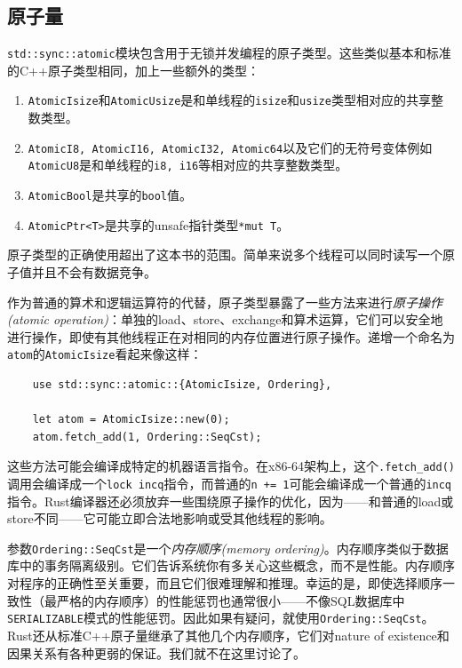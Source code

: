 \subsection{原子量}\label{atomic}
\texttt{std::sync::atomic}模块包含用于无锁并发编程的原子类型。这些类似基本和标准的C++原子类型相同，加上一些额外的类型：
\begin{enumerate}
    \item \texttt{AtomicIsize}和\texttt{AtomicUsize}是和单线程的\texttt{isize}和\texttt{usize}类型相对应的共享整数类型。
    \item \texttt{AtomicI8, AtomicI16, AtomicI32, Atomic64}以及它们的无符号变体例如\texttt{AtomicU8}是和单线程的\texttt{i8, i16}等相对应的共享整数类型。
    \item \texttt{AtomicBool}是共享的\texttt{bool}值。
    \item \texttt{AtomicPtr<T>}是共享的unsafe指针类型\texttt{*mut T}。
\end{enumerate}

原子类型的正确使用超出了这本书的范围。简单来说多个线程可以同时读写一个原子值并且不会有数据竞争。

作为普通的算术和逻辑运算符的代替，原子类型暴露了一些方法来进行\emph{原子操作(atomic operation)}：单独的load、store、exchange和算术运算，它们可以安全地进行操作，即使有其他线程正在对相同的内存位置进行原子操作。递增一个命名为\texttt{atom}的\texttt{AtomicIsize}看起来像这样：
\begin{verbatim}
    use std::sync::atomic::{AtomicIsize, Ordering},

    let atom = AtomicIsize::new(0);
    atom.fetch_add(1, Ordering::SeqCst);
\end{verbatim}

这些方法可能会编译成特定的机器语言指令。在x86-64架构上，这个\texttt{.fetch\_add()}调用会编译成一个\texttt{lock incq}指令，而普通的\texttt{n += 1}可能会编译成一个普通的\texttt{incq}指令。Rust编译器还必须放弃一些围绕原子操作的优化，因为——和普通的load或store不同——它可能立即合法地影响或受其他线程的影响。 

参数\texttt{Ordering::SeqCst}是一个\emph{内存顺序(memory ordering)}。内存顺序类似于数据库中的事务隔离级别。它们告诉系统你有多关心这些概念，而不是性能。内存顺序对程序的正确性至关重要，而且它们很难理解和推理。幸运的是，即使选择顺序一致性（最严格的内存顺序）的性能惩罚也通常很小——不像SQL数据库中\texttt{SERIALIZABLE}模式的性能惩罚。因此如果有疑问，就使用\texttt{Ordering::SeqCst}。Rust还从标准C++原子量继承了其他几个内存顺序，它们对nature of existence和因果关系有各种更弱的保证。我们就不在这里讨论了。

